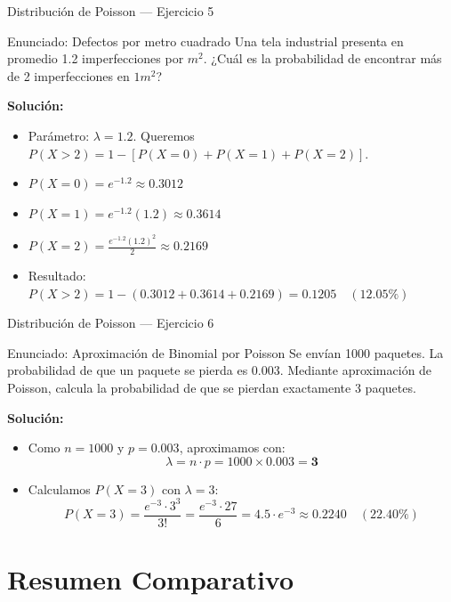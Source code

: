 \documentclass[aspectratio=169, 10pt]{beamer}
\begin{document}
\begin{frame}{Distribución de Poisson — Ejercicio 5}
    \begin{exampleblock}{Enunciado: Defectos por metro cuadrado}
        Una tela industrial presenta en promedio 1.2 imperfecciones por $m^2$. ¿Cuál es la probabilidad de encontrar más de 2 imperfecciones en $1 m^2$?
    \end{exampleblock}
     \pause
    \textbf{Solución:}
    \begin{itemize}
        \item Parámetro: $\lambda = 1.2$. Queremos $P(X > 2) = 1 - [P(X=0) + P(X=1) + P(X=2)]$.
        \item $P(X=0) = e^{-1.2} \approx 0.3012$
        \item $P(X=1) = e^{-1.2} (1.2) \approx 0.3614$
        \item $P(X=2) = \frac{e^{-1.2} (1.2)^2}{2} \approx 0.2169$
        \item Resultado: $P(X > 2) = 1 - (0.3012 + 0.3614 + 0.2169) = \mathbf{0.1205} \quad (12.05\%)$
    \end{itemize}
\end{frame}

\begin{frame}{Distribución de Poisson — Ejercicio 6}
    \begin{exampleblock}{Enunciado: Aproximación de Binomial por Poisson}
        Se envían 1000 paquetes. La probabilidad de que un paquete se pierda es 0.003. Mediante aproximación de Poisson, calcula la probabilidad de que se pierdan exactamente 3 paquetes.
    \end{exampleblock}
     \pause
    \textbf{Solución:}
    \begin{itemize}
        \item Como $n = 1000$ y $p = 0.003$, aproximamos con:
        $$\lambda = n \cdot p = 1000 \times 0.003 = \mathbf{3}$$
        \item Calculamos $P(X = 3)$ con $\lambda = 3$:
        $$P(X = 3) = \frac{e^{-3} \cdot 3^3}{3!} = \frac{e^{-3} \cdot 27}{6} = 4.5 \cdot e^{-3} \approx \mathbf{0.2240} \quad (22.40\%)$$
    \end{itemize}
\end{frame}

\section{Resumen Comparativo}
\end{document}
